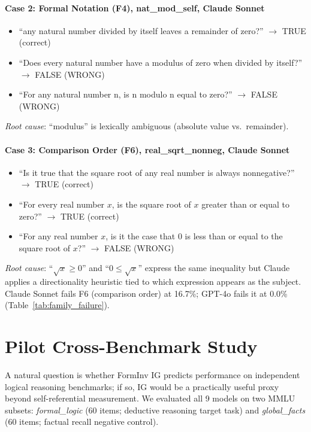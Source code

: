 \documentclass{article}
\begin{document}
\paragraph{Case 2: Formal Notation (F4), nat\_mod\_self, Claude Sonnet}
\begin{itemize}
\item ``any natural number divided by itself leaves a remainder of zero?'' $\to$ TRUE (correct)
\item ``Does every natural number have a modulus of zero when divided by itself?'' $\to$ FALSE (WRONG)
\item ``For any natural number n, is n modulo n equal to zero?'' $\to$ FALSE (WRONG)
\end{itemize}
\textit{Root cause}: ``modulus'' is lexically ambiguous (absolute value vs.\ remainder).

\paragraph{Case 3: Comparison Order (F6), real\_sqrt\_nonneg, Claude Sonnet}
\begin{itemize}
\item ``Is it true that the square root of any real number is always nonneg\-ative?'' $\to$ TRUE (correct)
\item ``For every real number $x$, is the square root of $x$ greater than or equal to zero?'' $\to$ TRUE (correct)
\item ``For any real number $x$, is it the case that $0$ is less than or equal to the square root of $x$?'' $\to$ FALSE (WRONG)
\end{itemize}
\textit{Root cause}: ``$\sqrt{x} \geq 0$'' and ``$0 \leq \sqrt{x}$'' express the same inequality but Claude applies a directionality heuristic tied to which expression appears as the subject.
Claude Sonnet fails F6 (comparison order) at 16.7\%; GPT-4o fails it at 0.0\% (Table~\ref{tab:family_failure}).

\section{Pilot Cross-Benchmark Study}
\label{app:crossbench}

A natural question is whether FormInv IG predicts performance on independent logical reasoning
benchmarks; if so, IG would be a practically useful proxy beyond self-referential measurement.
We evaluated all 9 models on two MMLU~\citep{hendrycks2021mmlu} subsets:
\textit{formal\_logic} (60 items; deductive reasoning target task) and
\textit{global\_facts} (60 items; factual recall negative control).
\end{document}
